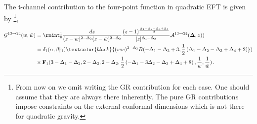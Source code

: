 The $\mathfrak{t}$-channel contribution to the four-point function in quadratic EFT is given by \footnote{From now on we omit writing the GR contribution for each case. One should assume that they are always there inherently. The pure GR contributions impose constraints on the external conformal dimensions which is not there for quadratic gravity.},
\begin{align}
    \begin{split}
    \mathcal{G}^{13\to 24}(w,\bar w)&=\rmint_{0}^{1}\frac{dz}{(z-w)^{2-\Delta_2}(z-\bar w)^{2-\Delta_2}}\frac{(z-1)^{\frac{\Delta_1-\Delta_2-\Delta_3+\Delta_4}{2}}}{|z|^{\Delta_1+\Delta_2}}\mathcal{A}^{13\to 24}(\mathbf{\Delta},z))\\&
 =\delta_1(\alpha,\beta|\gamma) \textcolor{black}{(w\bar w)^{2-
       \Delta_2}B(-\Delta _1-\Delta _2+3,\frac{1}{2} \left(\Delta _1-\Delta _2-\Delta _3+\Delta _4+2\right)})\\&
         \times \mathbf{F}
         _1(3-\Delta_1-\Delta_2,2-\Delta_2,2-\Delta_2,\frac{1}{2} \left(-\Delta _1-3 \Delta _2-\Delta _3+\Delta _4+8\right),\frac{1}{w},\frac{1}{\bar w})\,.
    \end{split}
\end{align}
\noindent
